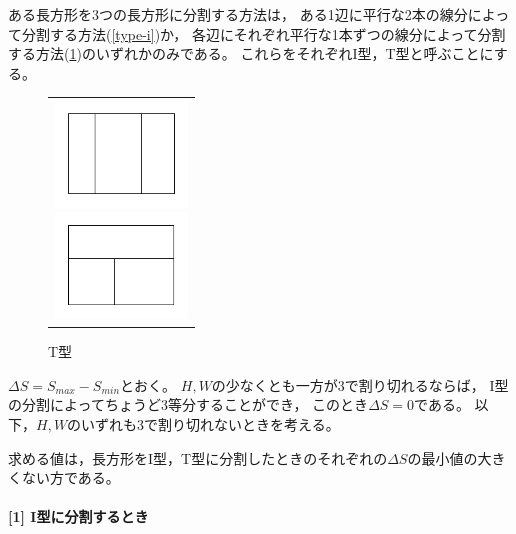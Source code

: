 \documentclass{article}
\newcommand{\myparagraph}[1]{\paragraph{#1}\mbox{}\\}
\begin{document}
ある長方形を3つの長方形に分割する方法は，
ある1辺に平行な2本の線分によって分割する方法(\cref{type-i})か，
各辺にそれぞれ平行な1本ずつの線分によって分割する方法(\cref{type-t})のいずれかのみである。
これらをそれぞれI型，T型と呼ぶことにする。

\begin{figure}[h]
    \begin{center}
        \begin{tabular}{c}
            \begin{minipage}{0.33\hsize}
                \begin{center}
                    \includegraphics[width=100pt]{type-i.png}
                    \caption{I型}
                    \label{type-i}
                \end{center}
            \end{minipage}

            \begin{minipage}{0.33\hsize}
                \begin{center}
                    \includegraphics[width=100pt]{type-t.png}
                    \caption{T型}
                    \label{type-t}
                \end{center}
            \end{minipage}
        \end{tabular}
    \end{center}
\end{figure}

$\Delta S = S_{max} - S_{min}$とおく。
$H, W$の少なくとも一方が3で割り切れるならば，
I型の分割によってちょうど3等分することができ，
このとき$\Delta S = 0$である。
以下，$H, W$のいずれも3で割り切れないときを考える。

求める値は，長方形をI型，T型に分割したときのそれぞれの$\Delta S$の最小値の大きくない方である。

\myparagraph{[1] I型に分割するとき}
\end{document}
